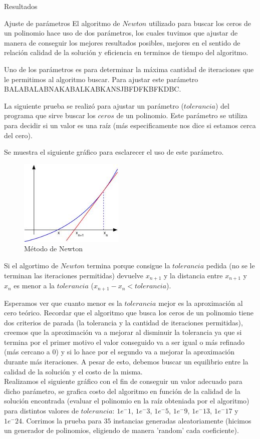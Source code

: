 \begin{section}{Resultados}
	\begin{subsection}{Ajuste de parámetros}
		El algoritmo de $Newton$ utilizado para buscar los ceros de un polinomio hace uso de dos parámetros, los cuales tuvimos que ajustar de manera de conseguir los mejores resultados posibles, mejores en el sentido de relación calidad de la solución y eficiencia en terminos de tiempo del algoritmo.
		
		Uno de los parámetros es para determinar la máxima cantidad de iteraciones que le permitimos al algoritmo buscar. Para ajustar este parámetro BALABALABNAKABALKABKANSJBFDFKBFKDBC.

		La siguiente prueba se realizó para ajustar un parámetro ($tolerancia$) del programa que sirve buscar los $ceros$ de un polinomio. Este parámetro se utiliza para decidir si un valor es una raíz (más especificamente nos dice si estamos cerca del cero).
		
		Se muestra el siguiente gráfico para esclarecer el uso de este parámetro.
		
		\begin{figure}[H]
		  \centering
			\includegraphics[width=5cm]{graficos/newton.jpg}
		  \caption{Método de Newton}
		  \label{fig:newton}
		\end{figure}
		
		Si el algortimo de $Newton$ termina porque consigue la $tolerancia$ pedida (no se le terminan las iteraciones permitidas) devuelve $x_{n+1}$ y la distancia entre $x_{n+1}$ y $x_n$ es menor a la $tolerancia$ ($x_{n+1} - x_n < tolerancia$).
		
		Esperamos ver que cuanto menor es la $tolerancia$ mejor es la aproximación al cero teórico. Recordar que el algoritmo que busca los ceros de un polinomio tiene dos criterios de parada (la tolerancia y la cantidad de iteraciones permitidas), creemos que la aproximación va a mejorar al disminuir la tolerancia ya que si termina por el primer motivo el valor conseguido va a ser igual o más refinado (más cercano a 0) y si lo hace por el segundo va a mejorar la aproximación durante más iteraciones. A pesar de esto, debemos buscar un equilibrio entre la calidad de la solución y el costo de la misma.\\
		Realizamos el siguiente gráfico con el fin de conseguir un valor adecuado para dicho parámetro, se grafica costo del algoritmo en función de la calidad de la solución encontrada (evaluar el polinomio en la raíz obteniada por el algoritmo) para distintos valores de $tolerancia$: $1e^-1$, $1e^-3$, $1e^-5$, $1e^-9$, $1e^-13$, $1e^-17$ y $1e^-24$. Corrimos la prueba para $35$ instancias generadas aleatoriamente (hicimos un generador de polinomios, eligiendo de manera 'random' cada coeficiente).
		

\end{subsection}
\end{section}
